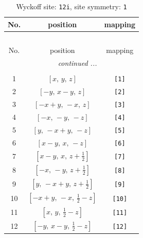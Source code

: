 \documentclass[fleqn,8pt]{jsarticle}
\begin{document}
\renewcommand{\arraystretch}{1.2}
\begin{longtable}{ccc}
\caption{Wyckoff site: {\tt 12i}, site symmetry: {\tt 1}}
 \\
 \hline \hline
No. & position & mapping \\ \hline \endfirsthead

\multicolumn{2}{l}{\tablename\ \thetable{}} \\
 \hline \hline
No. & position & mapping \\ \hline \endhead

 \hline \hline
\multicolumn{2}{r}{\footnotesize\it continued ...} \\ \endfoot

 \hline \hline
\multicolumn{2}{r}{} \\ \endlastfoot

1 & $\left[ x,\, y,\, z \right]$ & {\tt [1]} \\ \hline
2 & $\left[ - y,\, x - y,\, z \right]$ & {\tt [2]} \\ \hline
3 & $\left[ - x + y,\, - x,\, z \right]$ & {\tt [3]} \\ \hline
4 & $\left[ - x,\, - y,\, - z \right]$ & {\tt [4]} \\ \hline
5 & $\left[ y,\, - x + y,\, - z \right]$ & {\tt [5]} \\ \hline
6 & $\left[ x - y,\, x,\, - z \right]$ & {\tt [6]} \\ \hline
7 & $\left[ x - y,\, x,\, z + \frac{1}{2} \right]$ & {\tt [7]} \\ \hline
8 & $\left[ - x,\, - y,\, z + \frac{1}{2} \right]$ & {\tt [8]} \\ \hline
9 & $\left[ y,\, - x + y,\, z + \frac{1}{2} \right]$ & {\tt [9]} \\ \hline
10 & $\left[ - x + y,\, - x,\, \frac{1}{2} - z \right]$ & {\tt [10]} \\ \hline
11 & $\left[ x,\, y,\, \frac{1}{2} - z \right]$ & {\tt [11]} \\ \hline
12 & $\left[ - y,\, x - y,\, \frac{1}{2} - z \right]$ & {\tt [12]} \\
\end{longtable}
\end{document}
